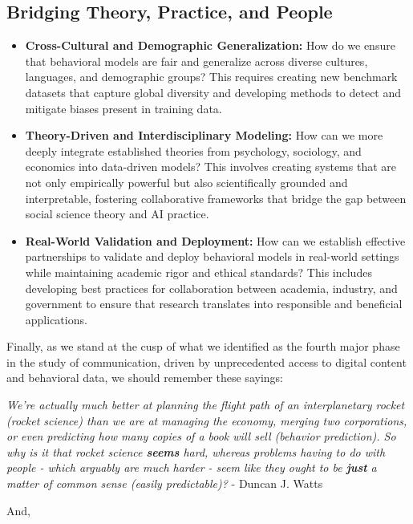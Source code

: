 \subsection*{Bridging Theory, Practice, and People}
\begin{itemize}
    \item \textbf{Cross-Cultural and Demographic Generalization:} How do we ensure that behavioral models are fair and generalize across diverse cultures, languages, and demographic groups? This requires creating new benchmark datasets that capture global diversity and developing methods to detect and mitigate biases present in training data.
    
    \item \textbf{Theory-Driven and Interdisciplinary Modeling:} How can we more deeply integrate established theories from psychology, sociology, and economics into data-driven models? This involves creating systems that are not only empirically powerful but also scientifically grounded and interpretable, fostering collaborative frameworks that bridge the gap between social science theory and AI practice.
    
    \item \textbf{Real-World Validation and Deployment:} How can we establish effective partnerships to validate and deploy behavioral models in real-world settings while maintaining academic rigor and ethical standards? This includes developing best practices for collaboration between academia, industry, and government to ensure that research translates into responsible and beneficial applications.
\end{itemize}



Finally, as we stand at the cusp of what we identified as the fourth major phase in the study of communication, driven by unprecedented access to digital content and behavioral data, we should remember these sayings:

\textit{We're actually much better at planning the flight path of an interplanetary rocket (rocket science) than we are at managing the economy, merging two corporations, or even predicting how many copies of a book will sell (behavior prediction). So why is it that rocket science \textbf{seems} hard, whereas problems having to do with people - which arguably are much harder - seem like they ought to be \textbf{just} a matter of common sense (easily predictable)?} - Duncan J. Watts       

\begin{center}
    And,
\end{center}

